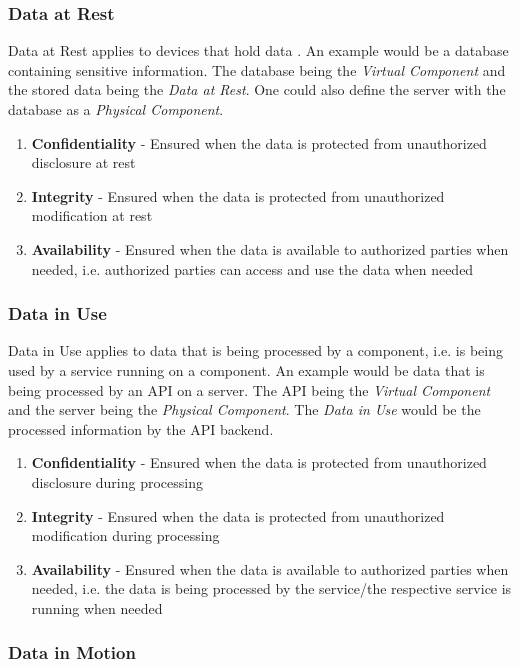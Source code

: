 \subsubsection*{Data at Rest}

Data at Rest applies to devices that hold data \cite{kanagasingham2008data}. An example would be a database containing sensitive information. The database being the \textit{Virtual Component} and the stored data being the \textit{Data at Rest}. One could also define the server with the database as a \textit{Physical Component}.

\begin{enumerate}
\item \textbf{Confidentiality} - Ensured when the data is protected from unauthorized disclosure at rest
\item \textbf{Integrity} - Ensured when the data is protected from unauthorized modification at rest
\item \textbf{Availability} - Ensured when the data is available to authorized parties when needed, i.e. authorized parties can access and use the data when needed
\end{enumerate}

\subsubsection*{Data in Use}

Data in Use applies to data that is being processed by a component, i.e. is being used by a service running on a component. An example would be data that is being processed by an API on a server. The API being the \textit{Virtual Component} and the server being the \textit{Physical Component}. The \textit{Data in Use} would be the processed information by the API backend.

\begin{enumerate}
\item \textbf{Confidentiality} - Ensured when the data is protected from unauthorized disclosure during processing
\item \textbf{Integrity} - Ensured when the data is protected from unauthorized modification during processing
\item \textbf{Availability} - Ensured when the data is available to authorized parties when needed, i.e. the data is being processed by the service/the respective service is running when needed
\end{enumerate}

\subsubsection*{Data in Motion}


